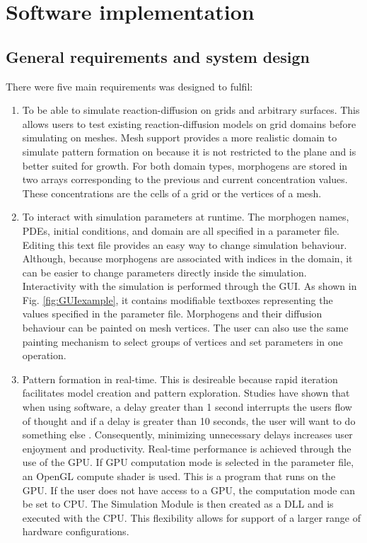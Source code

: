 \chapter{Software implementation}

\section{General requirements and system design}
There were five main requirements \ProgramName{} was designed to fulfil:

\begin{enumerate}
	\item To be able to simulate reaction-diffusion on grids and arbitrary surfaces. This allows users to test existing reaction-diffusion models on grid domains before simulating on meshes. Mesh support provides a more realistic domain to simulate pattern formation on because it is not restricted to the plane and is better suited for growth. For both domain types, morphogens are stored in two arrays corresponding to the previous and current concentration values. These concentrations are the cells of a grid or the vertices of a mesh. 
	
	\item To interact with simulation parameters at runtime. The morphogen names, PDEs, initial conditions, and domain are all specified in a parameter file. Editing this text file provides an easy way to change simulation behaviour. Although, because morphogens are associated with indices in the domain, it can be easier to change parameters directly inside the simulation. Interactivity with the simulation is performed through the GUI. As shown in Fig. \ref{fig:GUIexample}, it contains modifiable textboxes representing the values specified in the parameter file. Morphogens and their diffusion behaviour can be painted on mesh vertices. The user can also use the same painting mechanism to select groups of vertices and set parameters in one operation. 

	\item Pattern formation in real-time. This is desireable because rapid iteration facilitates model creation and pattern exploration. Studies have shown that when using software, a delay greater than 1 second interrupts the users flow of thought and if a delay is greater than 10 seconds, the user will want to do something else \citep{nielsen1994usability}. Consequently, minimizing unnecessary delays increases user enjoyment and productivity. Real-time performance is achieved through the use of the GPU. If GPU computation mode is selected in the parameter file, an OpenGL compute shader is used. This is a program that runs on the GPU. If the user does not have access to a GPU, the computation mode can be set to CPU. The Simulation Module is then created as a DLL and is executed with the CPU. This flexibility allows for support of a larger range of hardware configurations. 
	

\end{enumerate}
